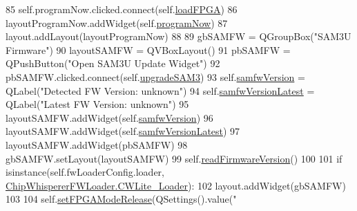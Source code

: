 \begin{DoxyCode}
{85         self.programNow.clicked.connect(self.\hyperlink{classsoftware_1_1chipwhisperer_1_1capture_1_1scopes_1_1cwhardware_1_1ChipWhispererFWLoaderGUI_1_1FWLoaderConfigGUI_ae52e067c51a171f9c495af93f86d55fb}{loadFPGA})
86         layoutProgramNow.addWidget(self.\hyperlink{classsoftware_1_1chipwhisperer_1_1capture_1_1scopes_1_1cwhardware_1_1ChipWhispererFWLoaderGUI_1_1FWLoaderConfigGUI_ada530ce59d28952a7c416d2886d5f700}{programNow})
87         layout.addLayout(layoutProgramNow)
88 
89         gbSAMFW = QGroupBox(\textcolor{stringliteral}{"SAM3U Firmware"})
90         layoutSAMFW = QVBoxLayout()
91         pbSAMFW = QPushButton(\textcolor{stringliteral}{"Open SAM3U Update Widget"})
92         pbSAMFW.clicked.connect(self.\hyperlink{classsoftware_1_1chipwhisperer_1_1capture_1_1scopes_1_1cwhardware_1_1ChipWhispererFWLoaderGUI_1_1FWLoaderConfigGUI_a07ab97a2684f788a6a911701f2ce42c3}{upgradeSAM3})
93         self.\hyperlink{classsoftware_1_1chipwhisperer_1_1capture_1_1scopes_1_1cwhardware_1_1ChipWhispererFWLoaderGUI_1_1FWLoaderConfigGUI_a80b6c9c862e4849673288ccc0f9eba12}{samfwVersion} = QLabel(\textcolor{stringliteral}{"Detected FW Version: unknown"})
94         self.\hyperlink{classsoftware_1_1chipwhisperer_1_1capture_1_1scopes_1_1cwhardware_1_1ChipWhispererFWLoaderGUI_1_1FWLoaderConfigGUI_aca483582160f3d44305cc3609dd4a2d7}{samfwVersionLatest} = QLabel(\textcolor{stringliteral}{"Latest FW Version: unknown"})
95         layoutSAMFW.addWidget(self.\hyperlink{classsoftware_1_1chipwhisperer_1_1capture_1_1scopes_1_1cwhardware_1_1ChipWhispererFWLoaderGUI_1_1FWLoaderConfigGUI_a80b6c9c862e4849673288ccc0f9eba12}{samfwVersion})
96         layoutSAMFW.addWidget(self.\hyperlink{classsoftware_1_1chipwhisperer_1_1capture_1_1scopes_1_1cwhardware_1_1ChipWhispererFWLoaderGUI_1_1FWLoaderConfigGUI_aca483582160f3d44305cc3609dd4a2d7}{samfwVersionLatest})
97         layoutSAMFW.addWidget(pbSAMFW)
98         gbSAMFW.setLayout(layoutSAMFW)
99         self.\hyperlink{classsoftware_1_1chipwhisperer_1_1capture_1_1scopes_1_1cwhardware_1_1ChipWhispererFWLoaderGUI_1_1FWLoaderConfigGUI_a2ae8c7ea0c1482e5b5e66f9541d24168}{readFirmwareVersion}()
100 
101         \textcolor{keywordflow}{if} isinstance(self.fwLoaderConfig.loader, 
      \hyperlink{classsoftware_1_1chipwhisperer_1_1capture_1_1scopes_1_1cwhardware_1_1ChipWhispererFWLoader_1_1CWLite__Loader}{ChipWhispererFWLoader.CWLite\_Loader}):
102             layout.addWidget(gbSAMFW)
103 
104         self.\hyperlink{classsoftware_1_1chipwhisperer_1_1capture_1_1scopes_1_1cwhardware_1_1ChipWhispererFWLoaderGUI_1_1FWLoaderConfigGUI_a772e10722e11db9c3a70d17a6c500933}{setFPGAModeRelease}(QSettings().value(\textcolor{stringliteral}{"%
}}
\end{DoxyCode}
